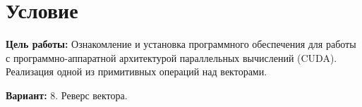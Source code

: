 \section{Условие}
\textbf{Цель работы:} Ознакомление и установка программного обеспечения для работы с программно-аппаратной архитектурой параллельных вычислений (CUDA). Реализация одной из примитивных операций над векторами.

\textbf{Вариант:} 8. Реверс вектора.
